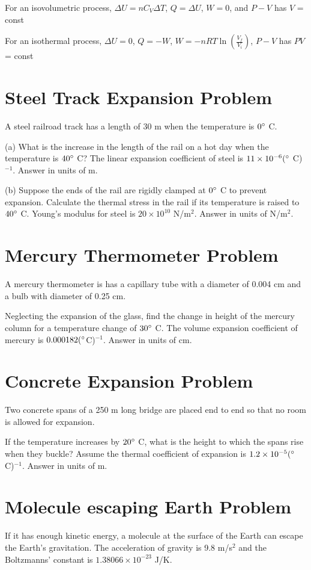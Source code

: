 \documentclass[../physics12.tex]{subfiles}
\begin{document}
For an isovolumetric process, $\Delta U = nC_V\Delta T$, $Q=\Delta U$, $W=0$, and $P-V$ has $V$ = const 

For an isothermal process, $\Delta U = 0$, $Q=-W$, $W=-nRT\ln\left(\frac{V_f}{V_i}\right)$, $P-V$ has $PV$ = const

\section{Steel Track Expansion Problem}
A steel railroad track has a length of 30 m when the temperature is $0\degree$ C.

(a) What is the increase in the length of the rail on a hot day when the temperature is $40\degree$ C? The linear expansion coefficient of steel is $11\times 10^{-6}(\degree$ C)$^{-1}$. Answer in units of m.

(b) Suppose the ends of the rail are rigidly clamped at $0\degree$ C to prevent expansion. Calculate the thermal stress in the rail if its temperature is raised to $40\degree$ C. Young's modulus for steel is $20\times 10^{10}$ N/m$^2$. Answer in units of N/m$^2$.

\section{Mercury Thermometer Problem}
A mercury thermometer is has a capillary tube with a diameter of 0.004 cm and a bulb with diameter of 0.25 cm.

Neglecting the expansion of the glass, find the change in height of the mercury column for a temperature change of $30\degree$ C. The volume expansion 
coefficient of mercury is $0.000182 (\degree$C)$^{-1}$. Answer in units of cm. 

\section{Concrete Expansion Problem}
Two concrete spans of a 250 m long bridge are placed end to end so that no room is allowed for expansion.

If the temperature increases by $20\degree$ C, what is the height to which the spans rise when they buckle? Assume the thermal 
coefficient of expansion is $1.2\times 10^{-5} (\degree$ C)$^{-1}$. Answer in units of m.

\section{Molecule escaping Earth Problem}
If it has enough kinetic energy, a molecule at the surface of the Earth can escape the Earth's gravitation. The acceleration of gravity is 
9.8 m/s$^2$ and the Boltzmanns' constant is $1.38066 \times 10^{-23}$ J/K. 
\end{document}
